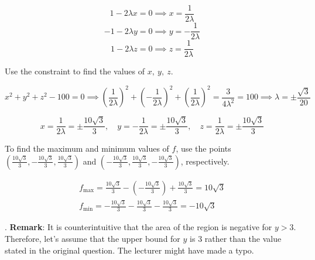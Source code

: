 \documentclass{article}
\begin{document}
\[1-2\lambda x=0\implies x=\frac1{2\lambda}\]
\[-1-2\lambda y=0\implies y=-\frac1{2\lambda}\]
\[1-2\lambda z=0\implies z=\frac1{2\lambda}\]

\hfill

\noindent Use the constraint to find the values of $x,\:y,\:z$.

\[x^2+y^2+z^2-100=0\implies\left(\frac1{2\lambda}\right)^2+\left(-\frac1{2\lambda}\right)^2+\left(\frac1{2\lambda}\right)^2=\frac3{4\lambda^2}=100\implies\lambda=\pm\frac{\sqrt3}{20}\]

\[x=\frac1{2\lambda}=\pm\frac{10\sqrt3}3,\quad y=-\frac1{2\lambda}=\pm\frac{10\sqrt3}3,\quad z=\frac1{2\lambda}=\pm\frac{10\sqrt3}3\]

\hfill

\noindent To find the maximum and minimum values of $f$, use the points $\left(\frac{10\sqrt3}3,-\frac{10\sqrt3}3,\frac{10\sqrt3}3\right)$ and $\left(-\frac{10\sqrt3}3,\frac{10\sqrt3}3,-\frac{10\sqrt3}3\right)$, respectively.

\hfill

\[
\boxed{\begin{array}{c}
\displaystyle f_{\text{max}}=\frac{10\sqrt3}3-\left(-\frac{10\sqrt3}3\right)+\frac{10\sqrt3}3=10\sqrt3\\
\displaystyle f_{\text{min}}=-\frac{10\sqrt3}3-\frac{10\sqrt3}3-\frac{10\sqrt3}3=-10\sqrt3\end{array}}
\]

\hfill

. \textbf{Remark}: It is counterintuitive that the area of the region is negative for $y>3$. Therefore, let's assume that the upper bound for $y$ is $3$ rather than the value stated in the original question. The lecturer might have made a typo.
\end{document}
